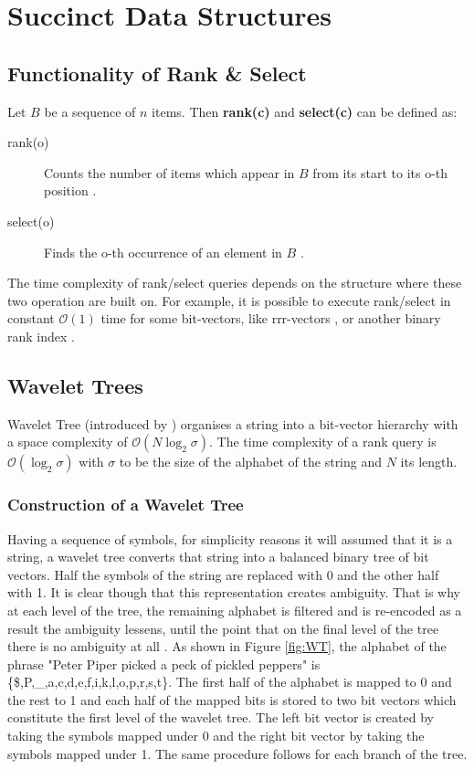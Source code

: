 \newpage
\appendix
\section{Succinct Data Structures}



\subsection{Functionality of Rank \& Select}\label{App:rank_select}
Let \(B\) be a sequence of \(n\) items. Then \textbf{rank(c)} and \textbf{select(c)} can be defined as:
\begin{description}
  \item[rank(o)] 
  Counts the number of items which appear in \(B\) from its start to its o-th position \cite{Jacobson89}.
  \item[select(o)]
  Finds the o-th occurrence of an element in \(B\) \cite{Jacobson89}.
\end{description}

The time complexity of rank/select queries depends on the structure where these two operation are built on. For example, it is possible to execute rank/select in constant \(\mathcal{O}(1)\) time for some bit-vectors, like rrr-vectors \cite{Raman}, or another binary rank index \cite{dillabaugh_2007}.

\subsection{Wavelet Trees} {\label{App:WT}}
Wavelet Tree (introduced by \citeauthor{Grossi} \citeyear{Grossi}) organises a string into a bit-vector hierarchy with a space complexity of \(\mathcal{O}(N\log_2\sigma)\). The time complexity of a rank query is \(\mathcal{O}(\log_2\sigma)\) with \(\sigma\) to be the size of the alphabet of the string \cite{bowe_2011} and $N$ its length.

\subsubsection{Construction of a Wavelet Tree}
Having a sequence of symbols, for simplicity reasons it will assumed that it is a string, a wavelet tree converts that string into a balanced binary tree of bit vectors. Half the symbols of the string are replaced with 0 and the other half with 1. It is clear though that this representation creates ambiguity. That is why at each level of the tree, the remaining alphabet is filtered and is re-encoded as a result the ambiguity lessens, until the point that on the final level of the tree there is no ambiguity at all \cite{bowe_2011}.
As shown in Figure \ref{fig:WT}, the alphabet of the phrase "Peter Piper picked a peck of pickled peppers" is \{\$,P,\_,a,c,d,e,f,i,k,l,o,p,r,s,t\}. The first half of the alphabet is mapped to 0 and the rest to 1 and each half of the mapped bits is stored to two bit vectors which constitute the first level of the wavelet tree. The left bit vector is created by taking the symbols mapped under 0 and the right bit vector by taking the symbols mapped under 1. The same procedure follows for each branch of the tree.

